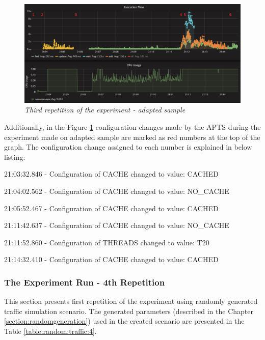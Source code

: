\documentclass[12pt,a4paper]{article}
\let\tmpone\enumerate
\let\tmptwo\endenumerate
\renewenvironment{enumerate}{\tmpone\addtolength{\itemsep}{-0.4\baselineskip}}{\tmptwo}
\begin{document}
\begin{figure}[!htb]
\centering
\includegraphics[width=1\textwidth]{3-adap}
\caption{\textit{Third repetition of the experiment - adapted sample}} \label{figure:random:screen:adapted:3}
\end{figure}

Additionally, in the Figure \ref{figure:random:screen:adapted:3} configuration changes made by the APTS during the experiment made on adapted sample are marked as red numbers at the top of the graph. The configuration change assigned to each number is explained in below listing: 

\begin{enumerate}
\item 21:03:32.846 - Configuration of CACHE changed to value: CACHED
\item 21:04:02.562 - Configuration of CACHE changed to value: NO\_CACHE
\item 21:05:52.467 - Configuration of CACHE changed to value: CACHED
\item 21:11:42.637 - Configuration of CACHE changed to value: NO\_CACHE
\item 21:11:52.860 - Configuration of THREADS changed to value: T20
\item 21:14:32.410 - Configuration of CACHE changed to value: CACHED
\end{enumerate}






\subsubsection{The Experiment Run - 4th Repetition}

This section presents first repetition of the experiment using randomly generated traffic simulation scenario. The generated parameters (described in the Chapter \ref{section:randomgeneration}) used in the created scenario are presented in the Table \ref{table:random:traffic:4}. 
\end{document}
